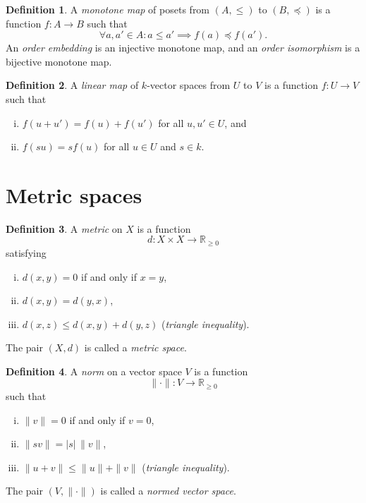 \documentclass{article}
\theoremstyle{definition}
\newtheorem{definition}{Definition}
\newcommand{\R}{\mathbb{R}}
\begin{document}
\begin{definition}
	A \emph{monotone map} of posets from $(A,\leq)$ to $(B,\preccurlyeq)$ is a function $f:A\to B$ such that
	\[
		\forall a,a'\in A : a\leq a' \implies f(a) \preccurlyeq f(a').
	\]
	An \emph{order embedding} is an injective monotone map, and an \emph{order isomorphism} is a bijective monotone map.
\end{definition}

\begin{definition}
	A \emph{linear map} of $k$-vector spaces from $U$ to $V$ is a function $f:U\to V$ such that
		\begin{enumerate}[i.]
			\item $f(u+u') = f(u) + f(u')$ for all $u,u'\in U$, and
			\item $f(su) = sf(u)$ for all $u\in U$ and $s\in k$.
		\end{enumerate}
\end{definition}


\section*{Metric spaces}

\begin{definition}
	A \emph{metric} on $X$ is a function
	\[
		d:X\times X \to \R_{\geq0}
	\]
	satisfying
	\begin{enumerate}[i.]
		\item $d(x,y)=0$ if and only if $x=y$,
		\item $d(x,y) = d(y,x)$,
		\item $d(x,z) \leq d(x,y) + d(y,z)$ \hspace{.7cm}(\emph{triangle inequality}).
	\end{enumerate}
	The pair $(X,d)$ is called a \emph{metric space}.
\end{definition}

\begin{definition}
	A \emph{norm} on a vector space $V$ is a function
	\[
		\|\cdot\| : V\to\R_{\geq0}
	\]
	such that
	\begin{enumerate}[i.]
		\item $\|v\| = 0$ if and only if $v=0$,
		\item $\|sv\| = |s| \,\|v\|$,
		\item $\|u+v\| \leq \|u\| + \|v\|$ \hspace{.7cm}(\emph{triangle inequality}).
	\end{enumerate}
	The pair $(V,\|\cdot\|)$ is called a \emph{normed vector space}.
\end{definition}
\end{document}

